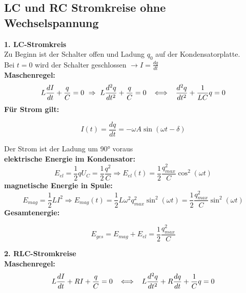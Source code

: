 \subsection{LC und RC Stromkreise ohne Wechselspannung}
\textbf{1. LC-Stromkreis} \\[1ex]
\hspace{3mm} Zu Beginn ist der Schalter offen und Ladung $q_0$ auf der Kondensatorplatte. \\
\hspace{3mm} Bei $t = 0$ wird der Schalter geschlossen $\rightarrow I = \frac{dq}{dt}$ \\[1ex]
\hspace{3mm} \textbf{Maschenregel:} 
\[
    L\frac{dI}{dt} + \frac{q}{C} = 0 \ \Rightarrow \ L\frac{d^2q}{dt^2} + \frac{q}{C} = 0 \hspace{2mm} \iff \hspace{2mm} \frac{d^2q}{dt^2} + \frac{1}{LC}q = 0
\]
\hspace{3mm} \textbf{Für Strom gilt:}
\begin{formulabox}
    \[
        I(t) = \frac{dq}{dt} = - \omega A \sin{(\omega t - \delta)}
    \]
\end{formulabox}
\hspace{3mm} Der Strom ist der Ladung um 90° voraus \\[1ex]
\hspace{3mm} \textbf{elektrische Energie im Kondensator:}
\[
    E_{el} = \frac{1}{2}qU_C = \frac{1}{2}\frac{q^2}{C} \Rightarrow E_{el}(t) = \frac{1}{2}\frac{q^2_{max}}{C} \cos^2{(\omega t)}
\]
\hspace{3mm} \textbf{magnetische Energie in Spule:}
\[
    E_{mag} = \frac{1}{2}LI^2 \Rightarrow E_{mag}(t) = \frac{1}{2}L \omega^2 q^2_{max} \sin^2{(\omega t)} = \frac{1}{2}\frac{q^2_{max}}{C} \sin^2{(\omega t)}
\]
\hspace{3mm} \textbf{Gesamtenergie:}
\begin{formulabox}
    \[
        E_{ges} = E_{mag} + E_{el} = \frac{1}{2}\frac{q^2_{max}}{C}
    \]
\end{formulabox}
\vspace{2mm}

\textbf{2. RLC-Stromkreise} \\[1ex]
\hspace{3mm} \textbf{Maschenregel:}
\[
    L\frac{dI}{dt} + RI + \frac{q}{C} = 0 \hspace{2mm} \iff \hspace{2mm} L\frac{d^2q}{dt^2} + R\frac{dq}{dt} + \frac{1}{C}q = 0
\]
